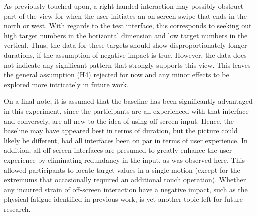 As previously touched upon, a right-handed interaction may possibly obstruct part of the view for  when the user initiates an on-screen swipe that ends in the north or west. With regards to the test interface, this corresponds to seeking out high target numbers in the horizontal dimension and low target numbers in the vertical. Thus, the data for these targets should show disproportionately longer durations, if the assumption of negative impact is true. However, the data does not indicate any significant pattern that strongly supports this view. This leaves the general assumption (H4) rejected for now and any minor effects to be explored more intricately in future work.

On a final note, it is assumed that the baseline has been significantly advantaged in this experiment, since the participants are all experienced with that interface and conversely, are all new to the idea of using off-screen input. Hence,  the baseline may have appeared best in terms of duration, but the picture could likely be different, had all interfaces been on par in terms of user experience. In addition, all off-screen interfaces are presumed to greatly enhance the user experience by  eliminating redundancy in the input, as was observed here. This allowed participants to locate target values in a single motion (except for the extremums that occasionally required an additional touch operation). Whether any  incurred   strain of off-screen interaction have a negative impact, such as the physical fatigue identified in previous work\cite{peep}, is yet another topic left for future research.  






